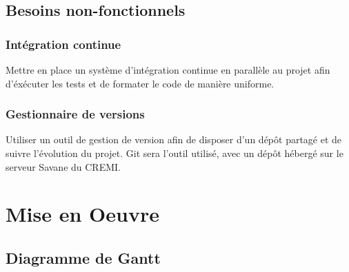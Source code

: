 \documentclass[12pt]{report}
\begin{document}
\newpage

\section{Besoins non-fonctionnels}
\subsection{Intégration continue}

Mettre en place un système d'intégration continue en parallèle au projet afin d'éxécuter les tests et de formater le code de manière uniforme.


\subsection{Gestionnaire de versions }
Utiliser un outil de gestion de version afin de disposer d'un dépôt partagé et de suivre l'évolution du projet. Git sera l'outil utilisé, avec un dépôt hébergé sur le serveur Savane du CREMI.

\newpage

\chapter*{Mise en Oeuvre}
\setcounter{chapter}{4}




\section{Diagramme de Gantt}



{}

\end{document}
